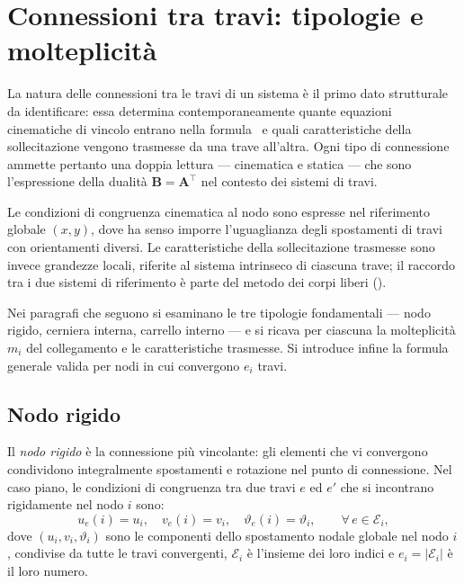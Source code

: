 \section{Connessioni tra travi: tipologie e molteplicità}
\label{sec:connessioni}

La natura delle connessioni tra le travi di un sistema è il
primo dato strutturale da identificare: essa determina
contemporaneamente quante equazioni cinematiche di vincolo
entrano nella formula~ e quali
caratteristiche della sollecitazione vengono trasmesse
da una trave all'altra. Ogni tipo di connessione ammette
pertanto una doppia lettura --- cinematica e statica ---
che sono l'espressione della dualità $\bm{B} = \bm{A}^{\top}$
nel contesto dei sistemi di travi.

Le condizioni di congruenza cinematica al nodo sono
espresse nel riferimento globale $(x, y)$, dove ha senso
imporre l'uguaglianza degli spostamenti di travi con
orientamenti diversi. Le caratteristiche della
sollecitazione trasmesse sono invece grandezze locali,
riferite al sistema intrinseco di ciascuna trave; il
raccordo tra i due sistemi di riferimento è parte del
metodo dei corpi liberi ().

Nei paragrafi che seguono si esaminano le tre tipologie
fondamentali --- nodo rigido, cerniera interna, carrello
interno --- e si ricava per ciascuna la molteplicità
$m_i$ del collegamento e le caratteristiche trasmesse.
Si introduce infine la formula generale valida per nodi
in cui convergono $e_i$ travi.


\subsection{Nodo rigido}
\label{subsec:nodo_rigido}

Il \emph{nodo rigido} è la connessione più vincolante:
gli elementi che vi convergono condividono integralmente
spostamenti e rotazione nel punto di connessione. Nel caso
piano, le condizioni di congruenza tra due travi $e$ ed
$e'$ che si incontrano rigidamente nel nodo $i$ sono:
\begin{equation}\label{eq:cong_nodo_rigido}
	u_e(i) = u_i, \quad
	v_e(i) = v_i, \quad
	\vartheta_e(i) = \vartheta_i, \qquad \forall\, e \in \mathcal{E}_i,
\end{equation}
dove $(u_i, v_i, \vartheta_i)$ sono le componenti dello
spostamento nodale globale nel nodo $i$, condivise da
tutte le travi convergenti, $\mathcal{E}_i$ è l'insieme
dei loro indici e $e_i = |\mathcal{E}_i|$ è il loro numero.


